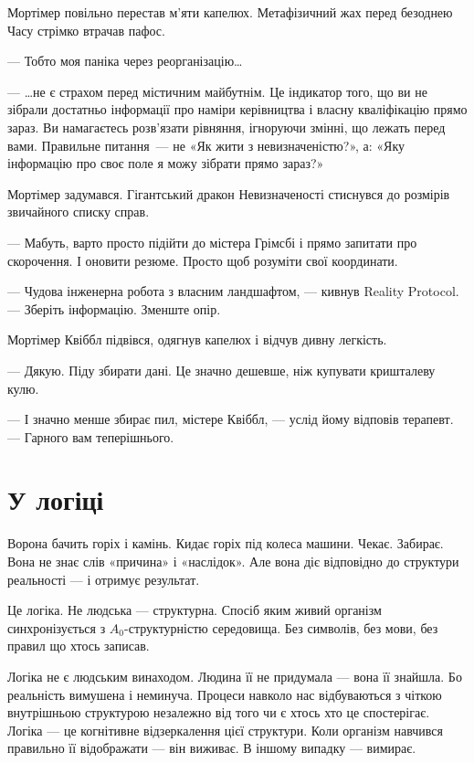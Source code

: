 \documentclass[12pt, a4paper, openany]{book}
\begin{document}
\begin{realitybox}
Мортімер повільно перестав м'яти капелюх. Метафізичний жах перед безоднею Часу стрімко втрачав пафос.

--- Тобто моя паніка через реорганізацію\ldots

--- \ldots не є страхом перед містичним майбутнім. Це індикатор того, що ви не зібрали достатньо інформації про наміри керівництва і власну кваліфікацію прямо зараз. Ви намагаєтесь розв'язати рівняння, ігноруючи змінні, що лежать перед вами. Правильне питання~--- не «Як жити з невизначеністю?», а: «Яку інформацію про своє поле я можу зібрати прямо зараз?»

\medskip
Мортімер задумався. Гігантський дракон Невизначеності стиснувся до розмірів звичайного списку справ.

--- Мабуть, варто просто підійти до містера Грімсбі і прямо запитати про скорочення. І оновити резюме. Просто щоб розуміти свої координати.

--- Чудова інженерна робота з власним ландшафтом, --- кивнув Reality Protocol. --- Зберіть інформацію. Зменште опір.

Мортімер Квіббл підвівся, одягнув капелюх і відчув дивну легкість.

--- Дякую. Піду збирати дані. Це значно дешевше, ніж купувати кришталеву кулю.

--- І значно менше збирає пил, містере Квіббл, --- услід йому відповів терапевт. --- Гарного вам теперішнього.
\end{realitybox}

\chapter{У логіці}

Ворона бачить горіх і камінь. Кидає горіх під колеса машини. Чекає. Забирає. Вона не знає слів «причина» і «наслідок». Але вона діє відповідно до структури реальності --- і отримує результат.

Це логіка. Не людська --- структурна. Спосіб яким живий організм синхронізується з $A_0$-структурністю середовища. Без символів, без мови, без правил що хтось записав.

Логіка не є людським винаходом. Людина її не придумала --- вона її знайшла. Бо реальність вимушена і неминуча. Процеси навколо нас відбуваються з чіткою внутрішньою структурою незалежно від того чи є хтось хто це спостерігає. Логіка --- це когнітивне відзеркалення цієї структури. Коли організм навчився правильно її відображати --- він виживає. В іншому випадку --- вимирає.
\end{document}
